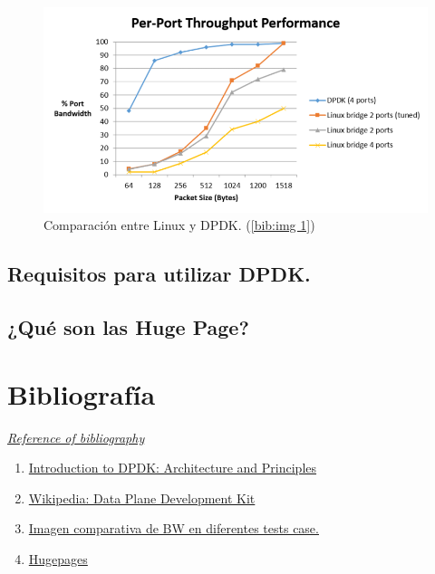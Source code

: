 \documentclass[12pt]{article}
\begin{document}
    \begin{figure}[h]
        \begin{center}
        \includegraphics[width=1\textwidth]{img/TB_per-port-throughput-performance-800x428.png}
        \caption{Comparación entre Linux y DPDK. (\ref{bib:img 1})}
        \end{center}
    \end{figure}
    
    \pagebreak
    
    \subsection{Requisitos para utilizar DPDK.}
    
    
    
    \subsection{¿Qué son las Huge Page?}
    
    
    
    \pagebreak
    \section{Bibliografía}
    \hyperref[bib:link1]{\emph{Reference of bibliography}}
    \begin{enumerate}
        \item \label{bib:link1} \href{https://blog.selectel.com/introduction-dpdk-architecture-principles/}{Introduction to DPDK: Architecture and Principles}
        
        \item \label{bib:link2}\href{https://en.wikipedia.org/wiki/Data_Plane_Development_Kit}{Wikipedia: Data Plane Development Kit}
        
        \item \label{bib:img1}\href{https://www.accton.com/Technology-Brief/intel-dpdk-performance-on-the-sau5081i-server/}{Imagen comparativa de BW en diferentes tests case.}
        
        \item \label{bib:link3}\href{https://wiki.debian.org/Hugepages}{Hugepages}
    \end{enumerate}
\end{document}
